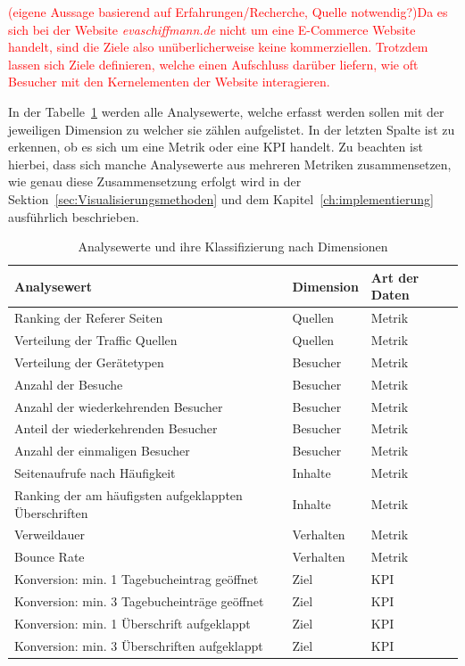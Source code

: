 \textcolor{red}{
    (eigene Aussage basierend auf Erfahrungen/Recherche, Quelle notwendig?)Da es sich bei der Website \textit{evaschiffmann.de} nicht um eine E-Commerce Website handelt, sind die Ziele also unüberlicherweise keine kommerziellen. Trotzdem lassen sich Ziele definieren, welche einen Aufschluss darüber liefern, wie oft Besucher mit den Kernelementen der Website interagieren.
}

In der Tabelle~\ref{tab:analysewerte} werden alle Analysewerte, welche erfasst werden sollen mit der jeweiligen Dimension zu welcher sie zählen aufgelistet. In der letzten Spalte ist zu erkennen, ob es sich um eine Metrik oder eine KPI handelt. Zu beachten ist hierbei, dass sich manche Analysewerte aus mehreren Metriken zusammensetzen, wie genau diese Zusammensetzung erfolgt wird in der Sektion~\ref{sec:Visualisierungsmethoden} und dem Kapitel~\ref{ch:implementierung} ausführlich beschrieben.

\begin{table}[H]
    \centering
    \begin{tabularx}{\textwidth}{l l l}
        \hline
        \textbf{Analysewert} & \textbf{Dimension} & \textbf{Art der Daten} \\
        \hline
        Ranking der Referer Seiten & Quellen & Metrik \\
        Verteilung der Traffic Quellen & Quellen & Metrik \\
        Verteilung der Gerätetypen & Besucher & Metrik \\
        Anzahl der Besuche & Besucher & Metrik \\
        Anzahl der wiederkehrenden Besucher & Besucher & Metrik \\
        Anteil der wiederkehrenden Besucher & Besucher & Metrik \\
        Anzahl der einmaligen Besucher & Besucher & Metrik \\
        Seitenaufrufe nach Häufigkeit & Inhalte & Metrik \\
        Ranking der am häufigsten aufgeklappten Überschriften & Inhalte & Metrik \\
        Verweildauer & Verhalten & Metrik \\
        Bounce Rate & Verhalten & Metrik \\
        Konversion: min. 1 Tagebucheintrag geöffnet & Ziel & KPI \\
        Konversion: min. 3 Tagebucheinträge geöffnet & Ziel & KPI \\
        Konversion: min. 1 Überschrift aufgeklappt & Ziel & KPI \\
        Konversion: min. 3 Überschriften aufgeklappt & Ziel & KPI \\
        \hline
    \end{tabularx}
    \caption{Analysewerte und ihre Klassifizierung nach Dimensionen}
    \label{tab:analysewerte}
\end{table}

